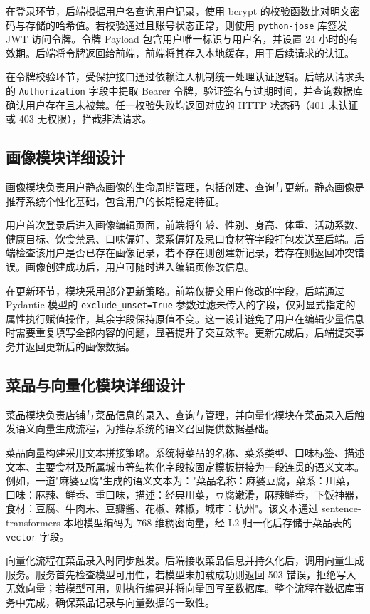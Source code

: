 在登录环节，后端根据用户名查询用户记录，使用 bcrypt 的校验函数比对明文密码与存储的哈希值。若校验通过且账号状态正常，则使用 \texttt{python-jose} 库签发 JWT 访问令牌。令牌 Payload 包含用户唯一标识与用户名，并设置 24 小时的有效期。后端将令牌返回给前端，前端将其存入本地缓存，用于后续请求的认证。

在令牌校验环节，受保护接口通过依赖注入机制统一处理认证逻辑。后端从请求头的 \texttt{Authorization} 字段中提取 Bearer 令牌，验证签名与过期时间，并查询数据库确认用户存在且未被禁。任一校验失败均返回对应的 HTTP 状态码（401 未认证或 403 无权限），拦截非法请求。

\subsection{画像模块详细设计}

画像模块负责用户静态画像的生命周期管理，包括创建、查询与更新。静态画像是推荐系统个性化基础，包含用户的长期稳定特征。

用户首次登录后进入画像编辑页面，前端将年龄、性别、身高、体重、活动系数、健康目标、饮食禁忌、口味偏好、菜系偏好及忌口食材等字段打包发送至后端。后端检查该用户是否已存在画像记录，若不存在则创建新记录，若存在则返回冲突错误。画像创建成功后，用户可随时进入编辑页修改信息。

在更新环节，模块采用部分更新策略。前端仅提交用户修改的字段，后端通过 Pydantic 模型的 \texttt{exclude\_unset=True} 参数过滤未传入的字段，仅对显式指定的属性执行赋值操作，其余字段保持原值不变。这一设计避免了用户在编辑少量信息时需要重复填写全部内容的问题，显著提升了交互效率。更新完成后，后端提交事务并返回更新后的画像数据。

\subsection{菜品与向量化模块详细设计}

菜品模块负责店铺与菜品信息的录入、查询与管理，并向量化模块在菜品录入后触发语义向量生成流程，为推荐系统的语义召回提供数据基础。

菜品向量构建采用文本拼接策略。系统将菜品的名称、菜系类型、口味标签、描述文本、主要食材及所属城市等结构化字段按固定模板拼接为一段连贯的语义文本。例如，一道"麻婆豆腐"生成的语义文本为："菜品名称：麻婆豆腐，菜系：川菜，口味：麻辣、鲜香、重口味，描述：经典川菜，豆腐嫩滑，麻辣鲜香，下饭神器，食材：豆腐、牛肉末、豆瓣酱、花椒、辣椒，城市：杭州"。该文本通过 sentence-transformers 本地模型编码为 768 维稠密向量，经 L2 归一化后存储于菜品表的 \texttt{vector} 字段。

向量化流程在菜品录入时同步触发。后端接收菜品信息并持久化后，调用向量生成服务。服务首先检查模型可用性，若模型未加载成功则返回 503 错误，拒绝写入无效向量；若模型可用，则执行编码并将向量回写至数据库。整个流程在数据库事务中完成，确保菜品记录与向量数据的一致性。

